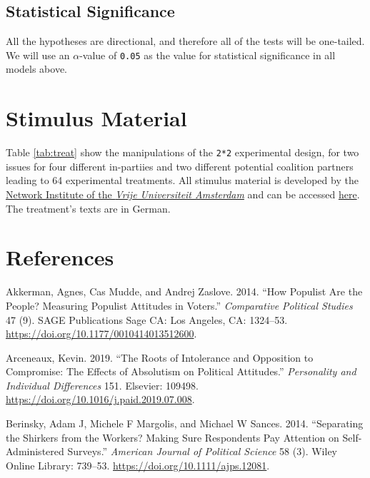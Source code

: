 \documentclass[]{article}
\begin{document}
\hypertarget{statistical-significance}{%
\subsection{Statistical Significance}\label{statistical-significance}}

All the hypotheses are directional, and therefore all of the tests will
be one-tailed. We will use an \(\alpha\)-value of \texttt{0.05} as the
value for statistical significance in all models above.

\hypertarget{stimulus-material}{%
\section{Stimulus Material}\label{stimulus-material}}

Table \ref{tab:treat} show the manipulations of the \texttt{2*2}
experimental design, for two issues for four different in-partiies and
two different potential coalition partners leading to 64 experimental
treatments. All stimulus material is developed by the
\href{https://networkinstitute.org/}{Network Institute of the
\emph{Vrije Universiteit Amsterdam}} and can be accessed
\href{https://github.com/MarikenvdVelden/willingness-to-accept-compromises/tree/main/docs/pre-analysis-plan/treatments}{here}.
The treatment's texts are in German.

\newpage

\hypertarget{references}{%
\section*{References}\label{references}}

\hypertarget{refs}{}
\leavevmode\hypertarget{ref-akkerman2014populist}{}%
Akkerman, Agnes, Cas Mudde, and Andrej Zaslove. 2014. ``How Populist Are
the People? Measuring Populist Attitudes in Voters.'' \emph{Comparative
Political Studies} 47 (9). SAGE Publications Sage CA: Los Angeles, CA:
1324--53. \url{https://doi.org/10.1177/0010414013512600}.

\leavevmode\hypertarget{ref-arceneaux2019roots}{}%
Arceneaux, Kevin. 2019. ``The Roots of Intolerance and Opposition to
Compromise: The Effects of Absolutism on Political Attitudes.''
\emph{Personality and Individual Differences} 151. Elsevier: 109498.
\url{https://doi.org/10.1016/j.paid.2019.07.008}.

\leavevmode\hypertarget{ref-berinsky2014separating}{}%
Berinsky, Adam J, Michele F Margolis, and Michael W Sances. 2014.
``Separating the Shirkers from the Workers? Making Sure Respondents Pay
Attention on Self-Administered Surveys.'' \emph{American Journal of
Political Science} 58 (3). Wiley Online Library: 739--53.
\url{https://doi.org/10.1111/ajps.12081}.
\end{document}
